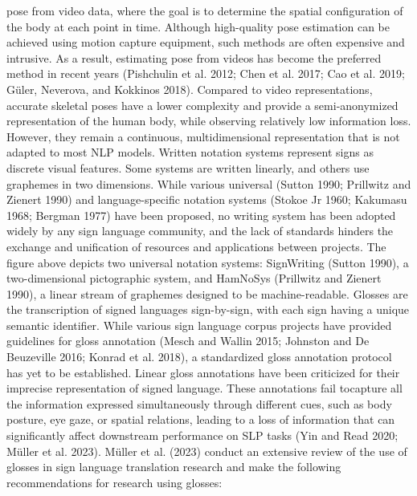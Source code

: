 pose from video data, where the goal is to determine the spatial configuration of the body at each
point in time. Although high-quality pose estimation can be achieved using motion capture
equipment, such methods are often expensive and intrusive. As a result, estimating pose from
videos has become the preferred method in recent years (Pishchulin et al. 2012; Chen et al. 2017;
Cao et al. 2019; Güler, Neverova, and Kokkinos 2018). Compared to video representations,
accurate skeletal poses have a lower complexity and provide a semi-anonymized representation of
the human body, while observing relatively low information loss. However, they remain a
continuous, multidimensional representation that is not adapted to most NLP models.
Written notation systems
represent signs as discrete visual features. Some systems are written linearly, and others use
graphemes in two dimensions. While various universal (Sutton 1990; Prillwitz and
Zienert 1990) and language-specific notation systems (Stokoe Jr 1960; Kakumasu 1968;
Bergman 1977) have been proposed, no writing system has been adopted widely by any sign
language community, and the lack of standards hinders the exchange and unification of resources
and applications between projects. The figure above depicts two universal notation systems:
SignWriting (Sutton 1990), a two-dimensional pictographic system, and HamNoSys (Prillwitz
and Zienert 1990), a linear stream of graphemes designed to be machine-readable.
Glosses
are the transcription of signed languages sign-by-sign, with each sign having a unique semantic
identifier. While various sign language corpus projects have provided guidelines for gloss
annotation (Mesch and Wallin 2015; Johnston and De Beuzeville 2016; Konrad et al. 2018), a
standardized gloss annotation protocol has yet to be established. Linear gloss annotations have
been criticized for their imprecise representation of signed language. These annotations fail tocapture all the information expressed simultaneously through different cues, such as body posture,
eye gaze, or spatial relations, leading to a loss of information that can significantly affect
downstream performance on SLP tasks (Yin and Read 2020; Müller et al. 2023).
Müller et al. (2023) conduct an extensive review of the use of glosses in sign language translation
research and make the following recommendations for research using glosses:

